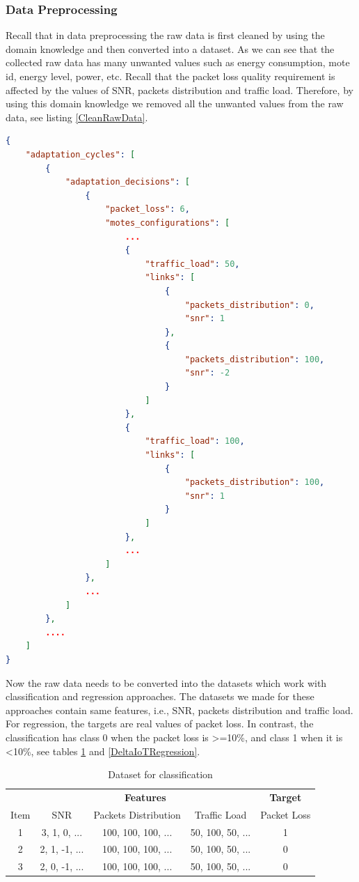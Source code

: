 \documentclass[a4paper,12pt]{article}
\begin{document}
\subsubsection{Data Preprocessing}
Recall that in data preprocessing the raw data is first cleaned by using the domain knowledge and then converted into a dataset. As we can see that the collected raw data has many unwanted values such as energy consumption, mote id, energy level, power, etc. Recall that the packet loss quality requirement is affected by the values of SNR, packets distribution and traffic load. Therefore, by using this domain knowledge we removed all the unwanted values from the raw data, see listing \ref{CleanRawData}.
\begin{lstlisting}[language=json, caption=An overview of the raw data after removing the unwanted values, label=CleanRawData]
{
	"adaptation_cycles": [
		{
			"adaptation_decisions": [
				{
					"packet_loss": 6,
					"motes_configurations": [
						...
						{
							"traffic_load": 50,
							"links": [
								{
									"packets_distribution": 0,
									"snr": 1
								},
								{
									"packets_distribution": 100,
									"snr": -2
								}
							]
						},
						{
							"traffic_load": 100,
							"links": [
								{
									"packets_distribution": 100,
									"snr": 1
								}
							]
						},
						...
					]
				},
				...
			]
		},
		....
	]
}
\end{lstlisting}
Now the raw data needs to be converted into the datasets which work with classification and regression approaches. The datasets we made for these approaches contain same features, i.e., SNR, packets distribution and traffic load. For regression, the targets are real values of packet loss. In contrast, the classification has class 0 when the packet loss is >=10\%, and class 1 when it is <10\%, see tables \ref{DeltaIoTClassification} and \ref{DeltaIoTRegression}.
\begin{table}[H]
	\centering
	\begin{tabular}{c|c|c|c|c}
		\hline
		\multicolumn{1}{c|}{} & \multicolumn{3}{c|}{\textbf{Features}} & \multicolumn{1}{c}{\textbf{Target}} \\
		\cline{1-1} \cline{2-4} \cline{5-5}
		\multicolumn{1}{c|}{Item} & \multicolumn{1}{c|}{SNR} & \multicolumn{1}{c|}{Packets Distribution} & \multicolumn{1}{c|}{Traffic Load} & \multicolumn{1}{c}{Packet Loss} \\
		\cline{1-1} \cline{2-2} \cline{3-3} \cline{4-4} \cline{5-5}
		1 & 3, 1, 0, ... & 100, 100, 100, ... & 50, 100, 50, ... & 1 \\
		\hline
		2 & 2, 1, -1, ... & 100, 100, 100, ... & 50, 100, 50, ... & 0 \\
		\hline
		3 & 2, 0, -1, ... & 100, 100, 100, ... & 50, 100, 50, ... & 0 \\
		\hline
	\end{tabular}
	\caption{Dataset for classification}
    \label{DeltaIoTClassification}
\end{table}
\end{document}
